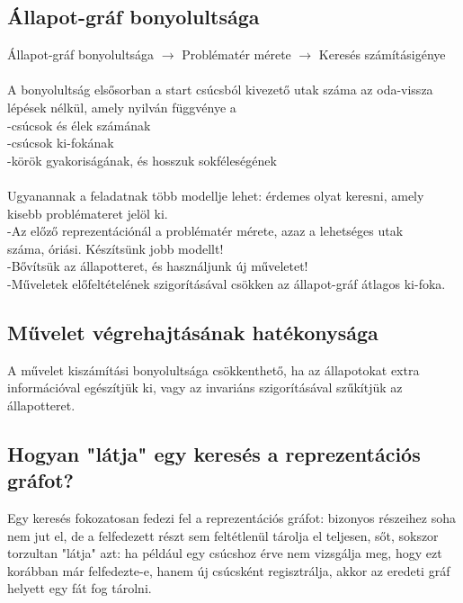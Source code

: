 \documentclass{article}
\begin{document}
	 \subsection{Állapot-gráf bonyolultsága}
	 Állapot-gráf bonyolultsága $\rightarrow$ Problématér mérete $\rightarrow$ Keresés számításigénye\\ \\
	 A bonyolultság elsősorban a start csúcsból kivezető utak száma az oda-vissza lépések nélkül, amely nyilván függvénye a\\
	 \hspace*{1em} -csúcsok és élek számának\\
	 \hspace*{1em} -csúcsok ki-fokának\\
	 \hspace*{1em} -körök gyakoriságának, és hosszuk sokféleségének\\ \\
	 Ugyanannak a feladatnak több modellje lehet: érdemes olyat keresni, amely kisebb problémateret jelöl ki.\\
	 \hspace*{1em} -Az előző reprezentációnál a problématér mérete, azaz a lehetséges utak \\ \hspace*{1em}száma, óriási. Készítsünk jobb modellt!\\
	 \hspace*{1em}-Bővítsük az állapotteret, és használjunk új műveletet!\\
	 \hspace*{1em}-Műveletek előfeltételének szigorításával csökken az állapot-gráf átlagos ki-foka.
	 
	 \subsection{Művelet végrehajtásának hatékonysága}
	 A művelet kiszámítási bonyolultsága csökkenthető, ha az állapotokat extra információval egészítjük ki, vagy az invariáns szigorításával szűkítjük az állapotteret. \\ 
	 
	 \subsection{Hogyan "látja" egy keresés a reprezentációs gráfot?}
	 Egy keresés fokozatosan fedezi fel a reprezentációs gráfot:
	 bizonyos részeihez soha nem jut el, de a felfedezett részt sem feltétlenül tárolja el teljesen, sőt, sokszor torzultan "látja" azt: ha például egy csúcshoz érve nem vizsgálja meg, hogy ezt korábban már felfedezte-e, hanem új csúcsként regisztrálja, akkor az eredeti gráf helyett egy fát fog tárolni.
	 
\end{document}
